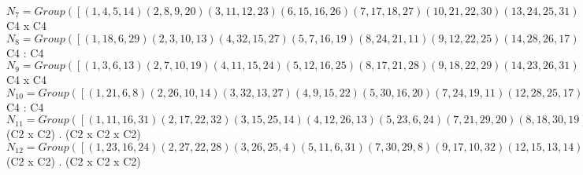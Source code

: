 \documentclass[varwidth=\maxdimen,border=10]{standalone}
\begin{document}
\begin{tabular}
$N_{7} = Group( [ ( 1, 4, 5,14)( 2, 8, 9,20)( 3,11,12,23)( 6,15,16,26)( 7,17,18,27)(10,21,22,30)(13,24,25,31)(19,28,29,32), ( 1, 5)( 2, 9)( 3,12)( 4,14)( 6,16)( 7,18)( 8,20)(10,22)(11,23)(13,25)(15,26)(17,27)(19,29)(21,30)(24,31)(28,32), ( 1, 3, 6,13)( 2, 7,10,19)( 4,11,15,24)( 5,12,16,25)( 8,17,21,28)( 9,18,22,29)(14,23,26,31)(20,27,30,32) ] )\cong$ C4 x C4\ \\
$N_{8} = Group( [ ( 1,18, 6,29)( 2, 3,10,13)( 4,32,15,27)( 5, 7,16,19)( 8,24,21,11)( 9,12,22,25)(14,28,26,17)(20,31,30,23), ( 1, 6)( 2,10)( 3,13)( 4,15)( 5,16)( 7,19)( 8,21)( 9,22)(11,24)(12,25)(14,26)(17,28)(18,29)(20,30)(23,31)(27,32), ( 1, 4, 5,14)( 2, 8, 9,20)( 3,11,12,23)( 6,15,16,26)( 7,17,18,27)(10,21,22,30)(13,24,25,31)(19,28,29,32) ] )\cong$ C4 : C4\ \\
$N_{9} = Group( [ ( 1, 3, 6,13)( 2, 7,10,19)( 4,11,15,24)( 5,12,16,25)( 8,17,21,28)( 9,18,22,29)(14,23,26,31)(20,27,30,32), ( 1, 6)( 2,10)( 3,13)( 4,15)( 5,16)( 7,19)( 8,21)( 9,22)(11,24)(12,25)(14,26)(17,28)(18,29)(20,30)(23,31)(27,32), ( 1, 4, 5,14)( 2, 8, 9,20)( 3,11,12,23)( 6,15,16,26)( 7,17,18,27)(10,21,22,30)(13,24,25,31)(19,28,29,32) ] )\cong$ C4 x C4\ \\
$N_{10} = Group( [ ( 1,21, 6, 8)( 2,26,10,14)( 3,32,13,27)( 4, 9,15,22)( 5,30,16,20)( 7,24,19,11)(12,28,25,17)(18,31,29,23), ( 1, 6)( 2,10)( 3,13)( 4,15)( 5,16)( 7,19)( 8,21)( 9,22)(11,24)(12,25)(14,26)(17,28)(18,29)(20,30)(23,31)(27,32), ( 1, 2, 5, 9)( 3,18,12, 7)( 4,21,14,30)( 6,10,16,22)( 8,26,20,15)(11,32,23,28)(13,29,25,19)(17,24,27,31) ] )\cong$ C4 : C4\ \\
$N_{11} = Group( [ ( 1,11,16,31)( 2,17,22,32)( 3,15,25,14)( 4,12,26,13)( 5,23, 6,24)( 7,21,29,20)( 8,18,30,19)( 9,27,10,28), ( 1,16)( 2,22)( 3,25)( 4,26)( 5, 6)( 7,29)( 8,30)( 9,10)(11,31)(12,13)(14,15)(17,32)(18,19)(20,21)(23,24)(27,28), ( 1, 2, 5, 9)( 3,18,12, 7)( 4,21,14,30)( 6,10,16,22)( 8,26,20,15)(11,32,23,28)(13,29,25,19)(17,24,27,31), ( 1, 3, 6,13)( 2, 7,10,19)( 4,11,15,24)( 5,12,16,25)( 8,17,21,28)( 9,18,22,29)(14,23,26,31)(20,27,30,32) ] )\cong$ (C2 x C2) . (C2 x C2 x C2)\ \\
$N_{12} = Group( [ ( 1,23,16,24)( 2,27,22,28)( 3,26,25, 4)( 5,11, 6,31)( 7,30,29, 8)( 9,17,10,32)(12,15,13,14)(18,21,19,20), ( 1,16)( 2,22)( 3,25)( 4,26)( 5, 6)( 7,29)( 8,30)( 9,10)(11,31)(12,13)(14,15)(17,32)(18,19)(20,21)(23,24)(27,28), ( 1, 2, 5, 9)( 3,18,12, 7)( 4,21,14,30)( 6,10,16,22)( 8,26,20,15)(11,32,23,28)(13,29,25,19)(17,24,27,31), ( 1, 3, 6,13)( 2, 7,10,19)( 4,11,15,24)( 5,12,16,25)( 8,17,21,28)( 9,18,22,29)(14,23,26,31)(20,27,30,32) ] )\cong$ (C2 x C2) . (C2 x C2 x C2)\ \\

\end{tabular}
\end{document}
